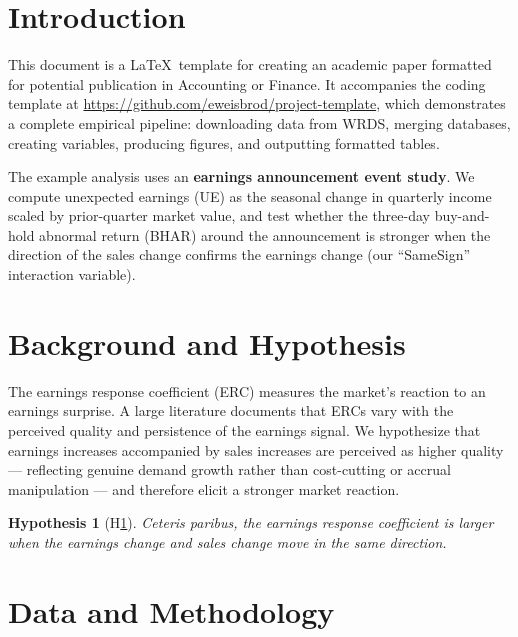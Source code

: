\documentclass[english,authoryear,IEEEtran,12pt]{article}
\newtheorem{hyp}{Hypothesis}
\begin{document}
\thispagestyle{empty}
\clearpage\newpage
\setcounter{page}{1}
\setcounter{secnumdepth}{3}
\setcounter{tocdepth}{3}


\section{Introduction} \label{section-intro}
\vspace{-0.1in}

This document is a \LaTeX\ template for creating an academic paper formatted for potential publication in Accounting or Finance. It accompanies the coding template at \url{https://github.com/eweisbrod/project-template}, which demonstrates a complete empirical pipeline: downloading data from WRDS, merging databases, creating variables, producing figures, and outputting formatted tables.

The example analysis uses an \textbf{earnings announcement event study}. We compute unexpected earnings (UE) as the seasonal change in quarterly income scaled by prior-quarter market value, and test whether the three-day buy-and-hold abnormal return (BHAR) around the announcement is stronger when the direction of the sales change confirms the earnings change (our ``SameSign'' interaction variable).


\section{Background and Hypothesis}\label{sec:background}

The earnings response coefficient (ERC) measures the market's reaction to an earnings surprise. A large literature documents that ERCs vary with the perceived quality and persistence of the earnings signal. We hypothesize that earnings increases accompanied by sales increases are perceived as higher quality --- reflecting genuine demand growth rather than cost-cutting or accrual manipulation --- and therefore elicit a stronger market reaction.

\begin{hyp}[H\ref{hyp:samesign}] \label{hyp:samesign}
Ceteris paribus, the earnings response coefficient is larger when the earnings change and sales change move in the same direction.
\end{hyp}


\section{Data and Methodology}\label{section-method}
\end{document}

